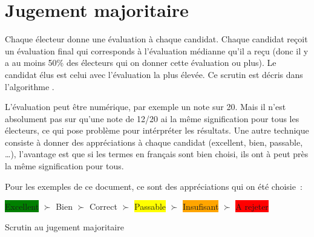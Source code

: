 \documentclass[../report]{subfiles}
\begin{document}
  \section{Jugement majoritaire}

  Chaque électeur donne une évaluation à chaque candidat.
  Chaque candidat reçoit un évaluation final qui corresponds à l'évaluation médianne qu'il a reçu (donc il y a au moins 
  50\% des électeurs qui on donner cette évaluation ou plus).
  Le candidat élus est celui avec l'évaluation la plus élevée.
  Ce scrutin est décris dans l'algorithme .

  L'évaluation peut être numérique, par exemple un note sur 20. Mais il n'est absolument pas sur qu'une note de 12/20 ai
  la même signification pour tous les électeurs, ce qui pose problème pour intérpréter les résultats. 
  Une autre technique consiste à donner des appréciations à chaque candidat (excellent, bien, passable, …), l'avantage
  est que si les termes en français sont bien choisi, ils ont à peut près la même signification pour tous.

  Pour les exemples de ce document, ce sont des appréciations qui on été choisie~: 

  \begin{center}
  \colorbox{green}{Excellent} $\succ$
  \colorbox{green!50!yellow}{Bien} $\succ$
  \colorbox{green!25!yellow}{Correct} $\succ$
  \colorbox{yellow}{Passable} $\succ$
  \colorbox{orange}{Insufisant} $\succ$
  \colorbox{red}{A rejeter}
  \end{center}
  
  \begin{algorithm}[H]
  \caption{Scrutin au jugement majoritaire}%
  \label{scrutin:jugement-maj}
  \begin{algorithmic}[1]
    \ENDFOR{}
    \ENDFOR{}
  \end{algorithmic}
  \end{algorithm}
\end{document}
